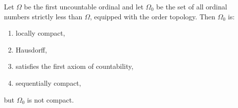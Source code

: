 Let $\Omega$ be the first uncountable ordinal and let $\Omega_0$ be the set of all ordinal numbers strictly less than $\Omega$, equipped with the order topology. Then $\Omega_0$ is:

\begin{enumerate}
\item locally compact,
\item Hausdorff,
\item satisfies the first axiom of countability,
\item sequentially compact,
\end{enumerate}

but $\Omega_0$ is not compact.
